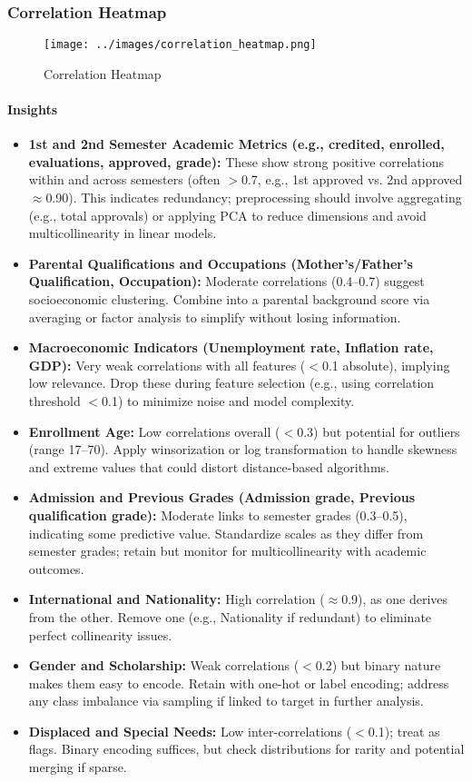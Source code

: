 \documentclass[twoside,final]{hcmut-report}
\begin{document}
\subsubsection{Correlation Heatmap}
\begin{figure}[H]
  \centering
  \texttt{[image: ../images/correlation\_heatmap.png]}
  \caption{Correlation Heatmap}
  \label{core_heat}
\end{figure}
\paragraph{Insights}
\begin{itemize}
  \item \textbf{1st and 2nd Semester Academic Metrics (e.g., credited, enrolled, evaluations, approved, grade):} These show strong positive correlations within and across semesters (often $>$0.7, e.g., 1st approved vs. 2nd approved $\approx$0.90). This indicates redundancy; preprocessing should involve aggregating (e.g., total approvals) or applying PCA to reduce dimensions and avoid multicollinearity in linear models.
  \item \textbf{Parental Qualifications and Occupations (Mother's/Father's Qualification, Occupation):} Moderate correlations (0.4--0.7) suggest socioeconomic clustering. Combine into a parental background score via averaging or factor analysis to simplify without losing information.
  \item \textbf{Macroeconomic Indicators (Unemployment rate, Inflation rate, GDP):} Very weak correlations with all features ($<$0.1 absolute), implying low relevance. Drop these during feature selection (e.g., using correlation threshold $<$0.1) to minimize noise and model complexity.
  \item \textbf{Enrollment Age:} Low correlations overall ($<$0.3) but potential for outliers (range 17--70). Apply winsorization or log transformation to handle skewness and extreme values that could distort distance-based algorithms.
  \item \textbf{Admission and Previous Grades (Admission grade, Previous qualification grade):} Moderate links to semester grades (0.3--0.5), indicating some predictive value. Standardize scales as they differ from semester grades; retain but monitor for multicollinearity with academic outcomes.
  \item \textbf{International and Nationality:} High correlation ($\approx$0.9), as one derives from the other. Remove one (e.g., Nationality if redundant) to eliminate perfect collinearity issues.
  \item \textbf{Gender and Scholarship:} Weak correlations ($<$0.2) but binary nature makes them easy to encode. Retain with one-hot or label encoding; address any class imbalance via sampling if linked to target in further analysis.
  \item \textbf{Displaced and Special Needs:} Low inter-correlations ($<$0.1); treat as flags. Binary encoding suffices, but check distributions for rarity and potential merging if sparse.
\end{itemize}
\end{document}
